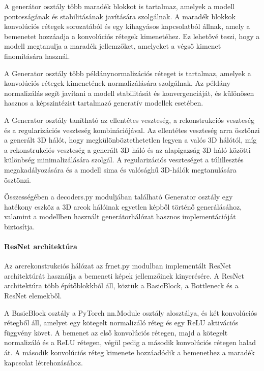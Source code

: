 \documentclass[12pt,a4]{article}
\begin{document}
             A generátor osztály több maradék blokkot is tartalmaz, amelyek a modell pontosságának és stabilitásának javítására szolgálnak. 
             A maradék blokkok konvolúciós rétegek sorozatából és egy kihagyásos kapcsolatból állnak, amely a bemenetet hozzáadja a konvolúciós rétegek kimenetéhez.
             Ez lehetővé teszi, hogy a modell megtanulja a maradék jellemzőket, amelyeket a végső kimenet finomítására használ.
             
             A Generator osztály több példánynormalizációs réteget is tartalmaz, amelyek a konvolúciós rétegek kimenetének normalizálására szolgálnak.
             Az példány normalizálás segít javítani a modell stabilitását és konvergenciáját, és különösen hasznos a képszintézist tartalmazó generatív modellek esetében.
             
             A Generator osztály tanítható az ellentétes veszteség, a rekonstrukciós veszteség és a regularizációs veszteség kombinációjával.
             Az ellentétes veszteség arra ösztönzi a generált 3D hálót, hogy megkülönböztethetetlen legyen a valós 3D hálótól, míg a rekonstrukciós veszteség a generált 3D háló és az alapigazság 3D háló közötti különbség minimalizálására szolgál. 
             A regularizációs veszteséget a túlillesztés megakadályozására és a modell sima és valósághű 3D-hálók megtanulására ösztönzi.
             
             Összességében a decoders.py moduljában található Generator osztály egy hatékony eszköz a 3D arcok hálóinak egyetlen képből történő generálásához,
             valamint a modellben használt generátorhálózat hasznos implementációját biztosítja.
                     
         \paragraph{ResNet architektúra}

            Az arcrekonstrukciós hálózat az frnet.py modulban implementált ResNet architektúrát használja a bemeneti képek jellemzőinek kinyerésére. 
            A ResNet architektúra több építőblokkból áll, köztük a BasicBlock, a Bottleneck és a ResNet elemekből.
            
            A BasicBlock osztály a PyTorch nn.Module osztály alosztálya, és két konvolúciós rétegből áll, amelyet egy kötegelt normalizáló réteg és egy ReLU aktivációs függvény követ.
            A bemenet az első konvolúciós rétegen, majd a kötegelt normalizáló és a ReLU rétegen, végül pedig a második konvolúciós rétegen halad át. 
            A második konvolúciós réteg kimenete hozzáadódik a bemenethez a maradék kapcsolat létrehozásához.
            
\end{document}
